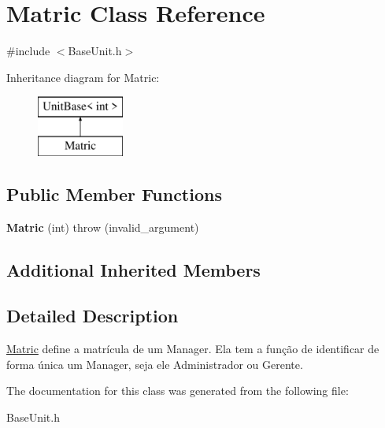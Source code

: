 \hypertarget{classMatric}{\section{Matric Class Reference}
\label{classMatric}
}


{\ttfamily \#include $<$Base\-Unit.\-h$>$}

Inheritance diagram for Matric\-:\begin{figure}[H]
\begin{center}
\leavevmode
\includegraphics[height=2.000000cm]{classMatric}
\end{center}
\end{figure}
\subsection*{Public Member Functions}
\begin{DoxyCompactItemize}
\item 
\hypertarget{classMatric_a0f74486adf618928641729a73ee76286}{{\bfseries Matric} (int)  throw (invalid\-\_\-argument)}\label{classMatric_a0f74486adf618928641729a73ee76286}

\end{DoxyCompactItemize}
\subsection*{Additional Inherited Members}


\subsection{Detailed Description}
\hyperlink{classMatric}{Matric} define a matrícula de um Manager. Ela tem a função de identificar de forma única um Manager, seja ele Administrador ou Gerente. 

The documentation for this class was generated from the following file\-:\begin{DoxyCompactItemize}
\item 
Base\-Unit.\-h\end{DoxyCompactItemize}
